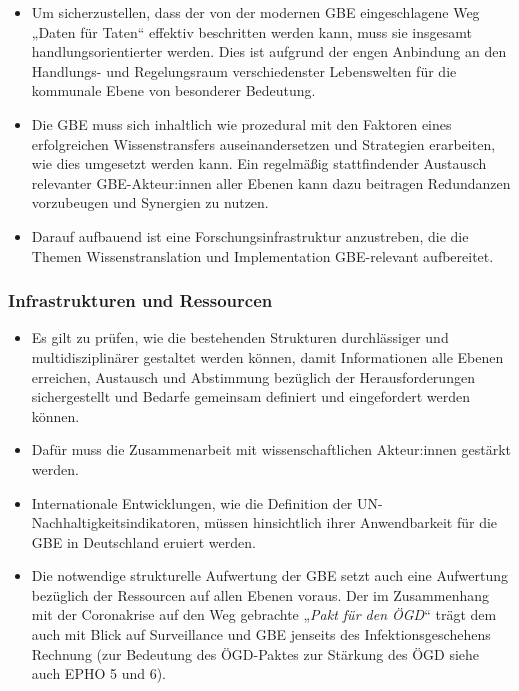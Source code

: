 \documentclass{article}
\begin{document}
\begin{itemize}
\item Um sicherzustellen, dass der von der modernen GBE eingeschlagene Weg „Daten für Taten“ effektiv beschritten werden kann, muss sie insgesamt handlungsorientierter werden. Dies ist aufgrund der engen Anbindung an den Handlungs- und Regelungsraum verschiedenster Lebenswelten für die kommunale Ebene von besonderer Bedeutung.


\item Die GBE muss sich inhaltlich wie prozedural mit den Faktoren eines erfolgreichen Wissenstransfers auseinandersetzen und Strategien erarbeiten, wie dies umgesetzt werden kann. Ein regelmäßig stattfindender Austausch relevanter GBE-Akteur:innen aller Ebenen kann dazu beitragen Redundanzen vorzubeugen und Synergien zu nutzen.


\item Darauf aufbauend ist eine Forschungsinfrastruktur anzustreben, die die Themen Wissenstranslation und Implementation GBE-relevant aufbereitet.


\end{itemize}

\subsubsection{Infrastrukturen und Ressourcen}\label{H691592}


\begin{itemize}
\item Es gilt zu prüfen, wie die bestehenden Strukturen durchlässiger und multidisziplinärer gestaltet werden können, damit Informationen alle Ebenen erreichen, Austausch und Abstimmung bezüglich der Herausforderungen sichergestellt und Bedarfe gemeinsam definiert und eingefordert werden können.


\item Dafür muss die Zusammenarbeit mit wissenschaftlichen Akteur:innen gestärkt werden.


\item Internationale Entwicklungen, wie die Definition der UN-Nachhaltigkeitsindikatoren, müssen hinsichtlich ihrer Anwendbarkeit für die GBE in Deutschland eruiert werden.


\item Die notwendige strukturelle Aufwertung der GBE setzt auch eine Aufwertung bezüglich der Ressourcen auf allen Ebenen voraus. Der im Zusammenhang mit der Coronakrise auf den Weg gebrachte „\emph{Pakt für den ÖGD}“ trägt dem auch mit Blick auf Surveillance und GBE jenseits des Infektionsgeschehens Rechnung (zur Bedeutung des ÖGD-Paktes zur Stärkung des ÖGD siehe auch EPHO 5 und 6).


\end{itemize}
\end{document}
